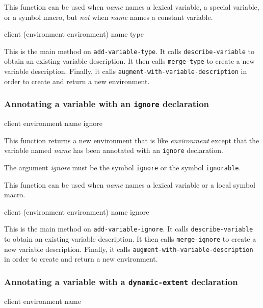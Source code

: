 This function can be used when \textit{name} names a lexical variable,
a special variable, or a symbol macro, but \emph{not}
when \textit{name} names a constant variable.

{\footnotesize
{}
{client
 (environment environment)
 name
 type}
}

This is the main method on \texttt{add-variable-type}.  It
calls \texttt{describe-variable} to obtain an existing variable
description.  It then calls \texttt{merge-type} to create a new
variable description.  Finally, it calls
\texttt{augment-with-variable-description} in order to create and
return a new environment.

\subsubsection{Annotating a variable with an \texttt{ignore} declaration}
\label{sec-annotating-a-variable-with-ignore}

{\footnotesize
{} {client environment name ignore}
}

This function returns a new environment that is like
\textit{environment} except that the variable named \textit{name} has
been annotated with an \texttt{ignore} declaration.

The argument \textit{ignore} must be the symbol \texttt{ignore} or the
symbol \texttt{ignorable}.

This function can be used when \textit{name} names a lexical variable
or a local symbol macro.

{\footnotesize
{}
{client
 (environment environment)
 name
 ignore}
}

This is the main method on \texttt{add-variable-ignore}.  It
calls \texttt{describe-variable} to obtain an existing variable
description.  It then calls \texttt{merge-ignore} to create a new
variable description.  Finally, it calls
\texttt{augment-with-variable-description} in order to create and
return a new environment.

\subsubsection{Annotating a variable with a \texttt{dynamic-extent} declaration}
\label{sec-annotating-a-variable-with-dynamic-extent}

{\footnotesize
{} {client environment name}
}

